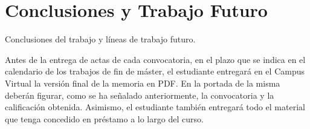 \chapter{Conclusiones y Trabajo Futuro}
\label{cap:conclusiones}

Conclusiones del trabajo y líneas de trabajo futuro.

Antes de la entrega de actas de cada convocatoria, en el plazo que se indica en el calendario de los trabajos de fin de máster, el estudiante entregará en el Campus Virtual la versión final de la memoria en PDF. En la portada de la misma deberán figurar, como se ha señalado anteriormente, la convocatoria y la calificación obtenida. Asimismo, el estudiante también entregará todo el material que tenga concedido en préstamo a lo largo del curso.


